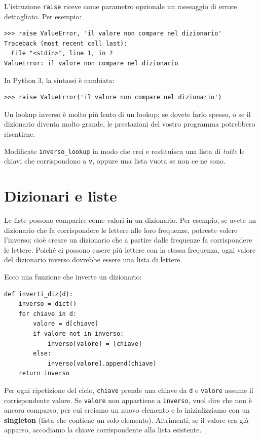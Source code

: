 \documentclass[10pt]{book}
\begin{document}
L'istruzione {\tt raise} riceve come parametro opzionale un messaggio di errore dettagliato. Per esempio:

\begin{verbatim}
>>> raise ValueError, 'il valore non compare nel dizionario'
Traceback (most recent call last):
  File "<stdin>", line 1, in ?
ValueError: il valore non compare nel dizionario
\end{verbatim}
%
In Python 3, la sintassi è cambiata:

\begin{verbatim}
>>> raise ValueError('il valore non compare nel dizionario')
\end{verbatim}
%

Un lookup inverso è molto più lento di un lookup; se dovete farlo spesso, o se il dizionario diventa molto grande, le prestazioni del vostro programma potrebbero risentirne.

\vspace{0.2in}
\begin{exercise}

Modificate \verb"inverso_lookup" in modo che crei e restituisca una lista di {\em tutte} le chiavi che corrispondono a {\tt v}, oppure una lista vuota se non ce ne sono.

\end{exercise}


\section{Dizionari e liste}
\label{invert}

Le liste possono comparire come valori in un dizionario. Per esempio, se avete un dizionario che fa corrispondere le lettere alle loro frequenze, potreste volere l'inverso; cioè creare un dizionario che a partire dalle frequenze fa corrispondere le lettere. Poiché ci possono essere più lettere con la stessa frequenza, ogni valore del dizionario inverso dovrebbe essere una lista di lettere.

Ecco una funzione che inverte un dizionario:

\begin{verbatim}
def inverti_diz(d):
    inverso = dict()
    for chiave in d:
        valore = d[chiave]
        if valore not in inverso:
            inverso[valore] = [chiave]
        else:
            inverso[valore].append(chiave)
    return inverso
\end{verbatim}
%
Per ogni ripetizione del ciclo, {\tt chiave} prende una chiave da {\tt d} e 
{\tt valore} assume il corrispondente valore.  Se {\tt valore} non appartiene a  {\tt inverso}, vuol dire che non è ancora comparso, per cui creiamo un nuovo elemento e lo inizializziamo con un {\bf singleton} (lista che contiene un solo elemento).  Altrimenti, se il valore era già apparso, accodiamo la chiave corrispondente alla lista esistente.
\end{document}
